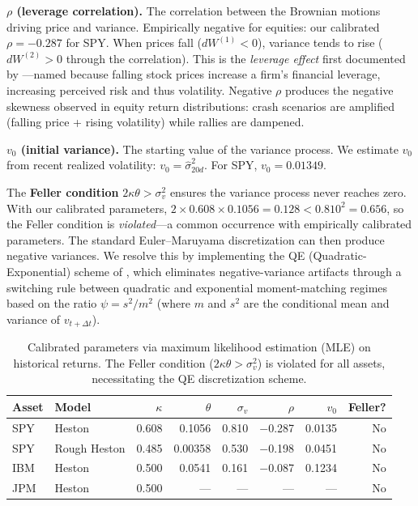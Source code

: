 \documentclass[11pt,a4paper]{article}
\begin{document}
\textbf{$\rho$ (leverage correlation).}
The correlation between the Brownian motions driving price and variance.
Empirically negative for equities: our calibrated $\rho = -0.287$ for SPY.
When prices fall ($dW^{(1)} < 0$), variance tends to rise ($dW^{(2)} > 0$ through the correlation).
This is the \emph{leverage effect} first documented by \citet{black1976}---named because falling stock prices increase a firm's financial leverage, increasing perceived risk and thus volatility.
Negative $\rho$ produces the negative skewness observed in equity return distributions: crash scenarios are amplified (falling price + rising volatility) while rallies are dampened.

\textbf{$v_0$ (initial variance).}
The starting value of the variance process.
We estimate $v_0$ from recent realized volatility: $v_0 = \hat{\sigma}_{20d}^2$.
For SPY, $v_0 = 0.01349$.

The \textbf{Feller condition} $2\kappa\theta > \sigma_v^2$ ensures the variance process never reaches zero.
With our calibrated parameters, $2 \times 0.608 \times 0.1056 = 0.128 < 0.810^2 = 0.656$, so the Feller condition is \emph{violated}---a common occurrence with empirically calibrated parameters.
The standard Euler--Maruyama discretization can then produce negative variances.
We resolve this by implementing the QE (Quadratic-Exponential) scheme of \citet{andersen2008}, which eliminates negative-variance artifacts through a switching rule between quadratic and exponential moment-matching regimes based on the ratio $\psi = s^2/m^2$ (where $m$ and $s^2$ are the conditional mean and variance of $v_{t+\Delta t}$).

\begin{table}[H]
\centering
\caption{Calibrated parameters via maximum likelihood estimation (MLE) on historical returns. The Feller condition ($2\kappa\theta > \sigma_v^2$) is violated for all assets, necessitating the QE discretization scheme.}
\label{tab:calibration}
\small
\begin{tabular}{@{}llrrrrrr@{}}
\toprule
\textbf{Asset} & \textbf{Model} & $\kappa$ & $\theta$ & $\sigma_v$ & $\rho$ & $v_0$ & \textbf{Feller?} \\
\midrule
SPY & Heston        & 0.608 & 0.1056  & 0.810 & $-$0.287 & 0.0135 & No \\
SPY & Rough Heston  & 0.485 & 0.00358 & 0.530 & $-$0.198 & 0.0451 & No \\
IBM & Heston        & 0.500 & 0.0541  & 0.161 & $-$0.087 & 0.1234 & No \\
JPM & Heston        & 0.500 & ---     & ---   & ---      & ---    & No \\
\bottomrule
\end{tabular}
\end{table}
\end{document}
